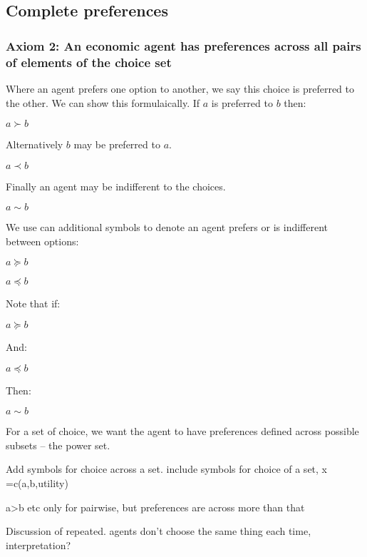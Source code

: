 
\subsection{Complete preferences}

\subsubsection{Axiom 2: An economic agent has preferences across all pairs of elements of the choice set}

Where an agent prefers one option to another, we say this choice is preferred to the other. We can show this formulaically. If \(a\) is preferred to \(b\) then:

\(a\succ b\)

Alternatively \(b\) may be preferred to \(a\).

\(a\prec b\)

Finally an agent may be indifferent to the choices.

\(a\sim b\)

We use can additional symbols to denote an agent prefers or is indifferent between options:

\(a\succeq b\)

\(a\preceq b\)

Note that if:

\(a\succeq b\)

And:

\(a\preceq b\)

Then:

\(a\sim b\)

For a set of choice, we want the agent to have preferences defined across possible subsets – the power set.

Add symbols for choice across a set. include symbols for choice of a set, x =c({a,b},utility)

a>b etc only for pairwise, but preferences are across more than that

Discussion of repeated. agents don't choose the same thing each time, interpretation?

